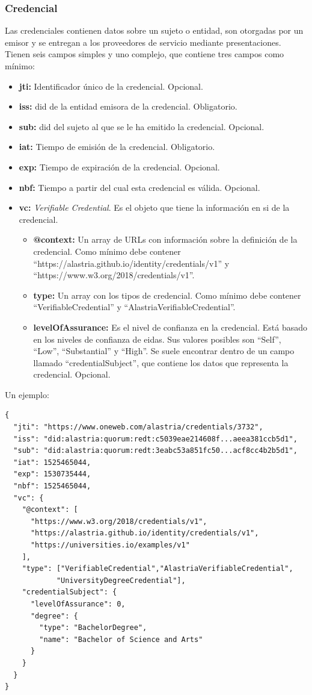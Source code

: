 \subsubsection*{Credencial}
Las credenciales contienen datos sobre un sujeto o entidad, son otorgadas por un emisor y se entregan a los proveedores de servicio mediante presentaciones. 
Tienen seis campos simples y uno complejo, que contiene tres campos como mínimo:
\begin{itemize}
    \item \textbf{jti:} Identificador único de la credencial. Opcional.
    \item \textbf{iss:} \acrshort{did} de la entidad emisora de la credencial. Obligatorio.
    \item \textbf{sub:} \acrshort{did} del sujeto al que se le ha emitido la credencial. Opcional.
    \item \textbf{iat:} Tiempo de emisión de la credencial. Obligatorio.
    \item \textbf{exp:} Tiempo de expiración de la credencial. Opcional.
    \item \textbf{nbf:} Tiempo a partir del cual esta credencial es válida. Opcional.
    \item \textbf{vc:} \textit{Verifiable Credential}. Es el objeto que tiene la información en si de la credencial.
    \begin{itemize}
        \item \textbf{@context:} Un array de URLs con información sobre la definición de la credencial. Como mínimo debe contener \\
        ``https://alastria.github.io/identity/credentials/v1'' y \\``https://www.w3.org/2018/credentials/v1''.
        \item \textbf{type:} Un array con los tipos de credencial. Como mínimo debe contener ``VerifiableCredential'' y ``AlastriaVerifiableCredential''.
        \item \textbf{levelOfAssurance:} Es el nivel de confianza en la credencial. Está basado en los niveles de confianza de \acrshort{eidas}. Sus valores posibles son ``Self'', ``Low'', ``Substantial'' y ``High''. Se suele encontrar dentro de un campo llamado ``credentialSubject'', que contiene los datos que representa la credencial. Opcional.
    \end{itemize}
\end{itemize}
Un ejemplo:
\begin{verbatim}
{
  "jti": "https://www.oneweb.com/alastria/credentials/3732",
  "iss": "did:alastria:quorum:redt:c5039eae214608f...aeea381ccb5d1",
  "sub": "did:alastria:quorum:redt:3eabc53a851fc50...acf8cc4b2b5d1",
  "iat": 1525465044,
  "exp": 1530735444,
  "nbf": 1525465044,
  "vc": {
    "@context": [
      "https://www.w3.org/2018/credentials/v1",
      "https://alastria.github.io/identity/credentials/v1",
      "https://universities.io/examples/v1"
    ],
    "type": ["VerifiableCredential","AlastriaVerifiableCredential", 
            "UniversityDegreeCredential"],
    "credentialSubject": {
      "levelOfAssurance": 0,
      "degree": {
        "type": "BachelorDegree",
        "name": "Bachelor of Science and Arts"
      }
    }
  }
}
\end{verbatim}

